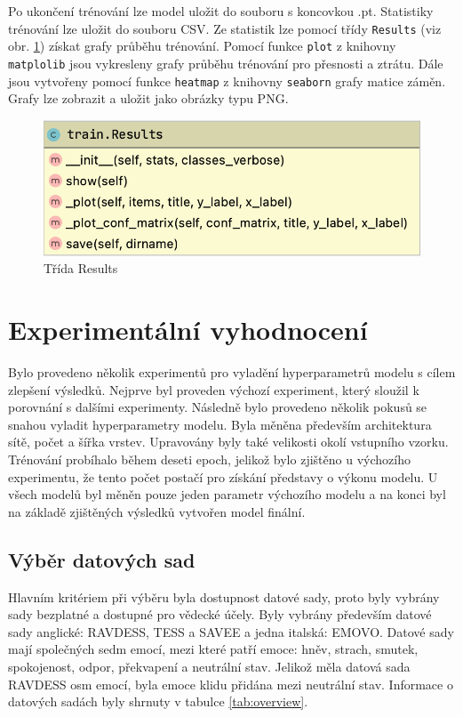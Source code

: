 \documentclass[FM,BP]{tulthesis}
\begin{document}
Po ukončení trénování lze model uložit do souboru s koncovkou .pt. Statistiky trénování lze uložit do souboru CSV. Ze statistik lze pomocí třídy \texttt{\mbox{Results}} (viz obr. \mbox{\ref{fig:results}}) získat grafy průběhu trénování. Pomocí funkce \texttt{\mbox{plot}} z knihovny \texttt{\mbox{matplolib}} jsou vykresleny grafy průběhu trénování pro přesnosti a ztrátu. Dále jsou vytvořeny pomocí funkce \texttt{\mbox{heatmap}} z knihovny \texttt{\mbox{seaborn}} grafy matice záměn. Grafy lze zobrazit a uložit jako obrázky typu PNG.

\begin{figure}[hbt!]
\centerline{\includegraphics[scale=.2]{train-results.png}}
\caption{Třída Results}
\label{fig:results}
\end{figure}
\FloatBarrier

\chapter{Experimentální vyhodnocení} %
Bylo provedeno několik experimentů pro vyladění hyperparametrů modelu s cílem zlepšení výsledků. Nejprve byl proveden výchozí experiment, který sloužil k porovnání s dalšími experimenty. Následně bylo provedeno několik pokusů se snahou vyladit hyperparametry modelu. Byla měněna především architektura sítě, počet a šířka vrstev. Upravovány byly také velikosti okolí vstupního vzorku. Trénování probíhalo během deseti epoch, jelikož bylo zjištěno u výchozího experimentu, že tento počet postačí pro získání představy o výkonu modelu. U všech modelů byl měněn pouze jeden parametr výchozího modelu a na konci byl na základě zjištěných výsledků vytvořen model finální.

\section{Výběr datových sad} %
Hlavním kritériem při výběru byla dostupnost datové sady, proto byly vybrány sady bezplatné a dostupné pro vědecké účely. Byly vybrány především datové sady anglické: RAVDESS, TESS a SAVEE a jedna italská: EMOVO. Datové sady mají společných sedm emocí, mezi které patří emoce: hněv, strach, smutek, spokojenost, odpor, překvapení a neutrální stav. Jelikož měla datová sada RAVDESS osm emocí, byla emoce klidu přidána mezi neutrální stav. Informace o datových sadách byly shrnuty v tabulce \mbox{\ref{tab:overview}}.
\end{document}
